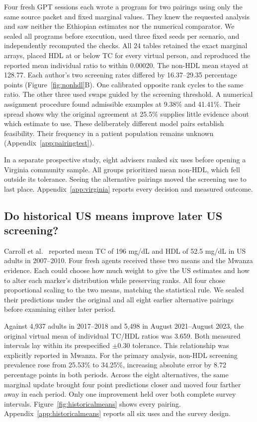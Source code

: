 \documentclass[sigconf,anonymous,review]{acmart}
\begin{document}
Four fresh GPT sessions each wrote a program for two pairings using only the same source packet and fixed marginal values. They knew the requested analysis and saw neither the Ethiopian estimates nor the numerical comparator. We sealed all programs before execution, used three fixed seeds per scenario, and independently recomputed the checks. All 24 tables retained the exact marginal arrays, placed HDL at or below TC for every virtual person, and reproduced the reported mean individual ratio to within 0.00020. The non-HDL mean stayed at 128.77. Each author's two screening rates differed by 16.37--29.35 percentage points (Figure~\ref{fig:nonhdl}B). One calibrated opposite rank cycles to the same ratio. The other three used swaps guided by the screening threshold. A numerical assignment procedure found admissible examples at 9.38\% and 41.41\%. Their spread shows why the original agreement at 25.5\% supplies little evidence about which estimate to use. These deliberately different model pairs establish feasibility. Their frequency in a patient population remains unknown (Appendix~\ref{app:pairingtest}).

In a separate prospective study, eight advisers ranked six uses before opening a Virginia community sample. All groups prioritized mean non-HDL, which fell outside its tolerance. Seeing the alternative pairings moved the screening use to last place. Appendix~\ref{app:virginia} reports every decision and measured outcome.

\subsection{Do historical US means improve later US screening?}
Carroll et al.~\cite{carroll_history} reported mean TC of 196 mg/dL and HDL of 52.5 mg/dL in US adults in 2007--2010. Four fresh agents received these two means and the Mwanza evidence. Each could choose how much weight to give the US estimates and how to alter each marker's distribution while preserving ranks. All four chose proportional scaling to the two means, matching the statistical rule. We sealed their predictions under the original and all eight earlier alternative pairings before examining either later period.

Against 4,937 adults in 2017--2018 and 5,498 in August 2021--August 2023, the original virtual mean of individual TC/HDL ratios was 3.659. Both measured intervals lay within its prespecified $\pm0.30$ tolerance. This relationship was explicitly reported in Mwanza. For the primary analysis, non-HDL screening prevalence rose from 25.53\% to 34.25\%, increasing absolute error by 8.72 percentage points in both periods. Across the eight alternatives, the same marginal update brought four point predictions closer and moved four farther away in each period. Only one improvement held over both complete survey intervals. Figure~\ref{fig:historicalmeans} shows every pairing. Appendix~\ref{app:historicalmeans} reports all six uses and the survey design.
\end{document}
